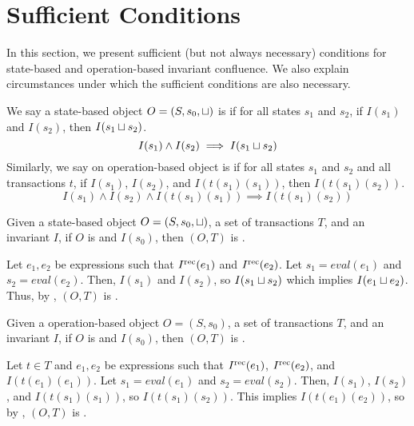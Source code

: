 \section{Sufficient Conditions}
In this section, we present sufficient (but not always necessary) conditions
for state-based and operation-based invariant confluence. We also explain
circumstances under which the sufficient conditions are also necessary.

\begin{definition}
  We say a state-based object $O = (S, s_0, \sqcup)$ is  if
  for all states $s_1$ and $s_2$, if $I(s_1)$ and $I(s_2)$, then $I(s_1 \sqcup
  s_2)$.
  \[
    I(s_1) \land I(s_2) \implies I(s_1 \sqcup s_2)
  \]
  Similarly, we say on operation-based object is  if for
  all states $s_1$ and $s_2$ and all transactions $t$, if $I(s_1)$, $I(s_2)$,
  and $I(t(s_1)(s_1))$, then $I(t(s_1)(s_2))$.
  \[
    I(s_1) \land I(s_2) \land I(t(s_1)(s_1)) \implies I(t(s_1)(s_2))
  \]
\end{definition}

\begin{claim}
  Given a state-based object $O = (S, s_0, \sqcup)$, a set of transactions $T$,
  and an invariant $I$, if $O$ is \Iclosed{} and $I(s_0)$, then $(O, T)$ is
  \Iconfluent.
\end{claim}
\begin{elidableproof}
  Let $e_1, e_2$ be expressions such that $I^{\text{rec}}(e_1)$ and $I^{\text{rec}}(e_2)$. Let
  $s_1 = eval(e_1)$ and $s_2 = eval(e_2)$. Then, $I(s_1)$ and $I(s_2)$, so
  $I(s_1 \sqcup s_2)$ which implies $I(e_1 \sqcup e_2)$. Thus, by
  , $(O, T)$ is \Iconfluent{}.
\end{elidableproof}

\begin{claim}
  Given a operation-based object $O = (S, s_0)$, a set of transactions $T$, and
  an invariant $I$, if $O$ is \Iclosed{} and $I(s_0)$, then $(O, T)$ is
  \Iconfluent.
\end{claim}
\begin{elidableproof}
  Let $t \in T$ and $e_1, e_2$ be expressions such that $I^{\text{rec}}(e_1)$,
  $I^{\text{rec}}(e_2)$, and $I(t(e_1)(e_1))$. Let $s_1 = eval(e_1)$ and $s_2 =
  eval(s_2)$. Then, $I(s_1)$, $I(s_2)$, and $I(t(s_1)(s_1))$, so
  $I(t(s_1)(s_2))$. This implies $I(t(e_1)(e_2))$, so by
  , $(O, T)$ is \Iconfluent.
\end{elidableproof}

